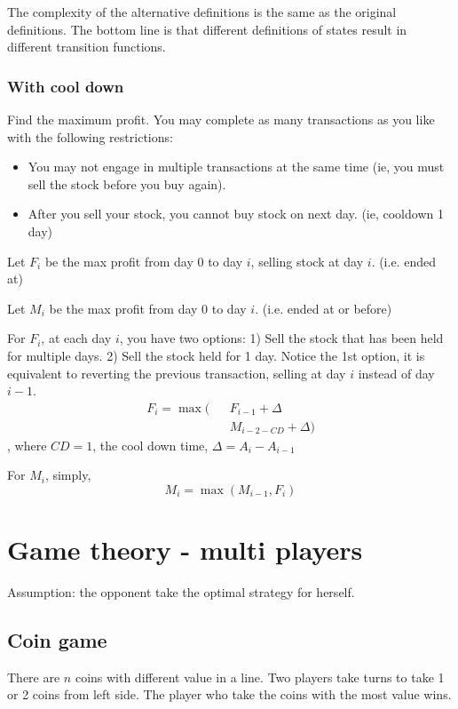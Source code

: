 The complexity of the alternative definitions is the same as the original definitions. The bottom line is that different definitions of states result in different transition functions.
\subsubsection{With cool down}

Find the maximum profit. You may complete as many transactions as you like with the following restrictions:
\begin{itemize}
\item You may not engage in multiple transactions at the same time (ie, you must sell the stock before you buy again).
\item After you sell your stock, you cannot buy stock on next day. (ie, cooldown 1 day)
\end{itemize}

Let $F_i$ be the max profit from day 0 to day $i$, selling stock at day $i$. (i.e. ended at)

Let $M_i$ be the max profit from day 0 to day $i$. (i.e. ended at or before)

For $F_i$, at each day $i$, you have two options: 1) Sell the stock that has been held for multiple days. 2) Sell the stock held for 1 day.
Notice the 1st option, it is equivalent to reverting the previous transaction, selling at day $i$ instead of day $i-1$.
\begin{eqnarray*}
F_{i}= \max\big(&&F_{i-1}+\Delta \\
&&M_{i-2-CD}+\Delta \big)
\end{eqnarray*}
, where $CD=1$, the cool down time, $\Delta = A_i-A_{i-1}$ 

For $M_i$, simply, 
$$
M_i = \max(M_{i-1}, F_i)
$$


\section{Game theory - multi players}
Assumption: the opponent take the optimal strategy for herself. 

\subsection{Coin game}
 There are $n$ coins with different value in a line. Two players take turns to take 1 or 2 coins from left side. The player who take the coins with the most value wins.

